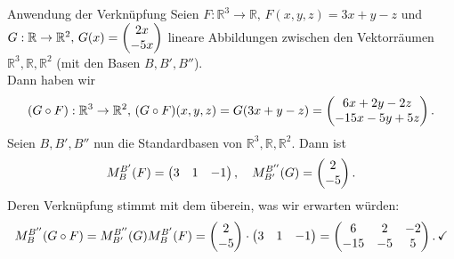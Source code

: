 \begin{Beispiel}{Anwendung der Verknüpfung}\label{beisp:12VerknupfungLinAbb}
Seien $F:\mathbb{R}^3\to\mathbb{R},\,F(x,y,z)=3x+y-z$ und $G:\mathbb{R}\to \mathbb{R}^2,\,G(x)=\begin{pmatrix}2x\\-5x\end{pmatrix}$ lineare Abbildungen zwischen den Vektorräumen $\mathbb{R}^3,\mathbb{R},\mathbb{R}^2$ (mit den Basen $B,B',B''$).\\
Dann haben wir
\begin{equation*}
    (G\circ F):\mathbb{R}^3\to\mathbb{R}^2,\, (G\circ F)(x,y,z)=G(3x+y-z)=\begin{pmatrix}6x+2y-2z\\-15x-5y+5z\end{pmatrix}.
\end{equation*}
Seien $B,B',B''$ nun die Standardbasen von $\mathbb{R}^3,\mathbb{R},\mathbb{R}^2$. Dann ist
\begin{equation*}
    M_B^{B'}(F)=\begin{pmatrix}3 & 1 &-1\end{pmatrix},\quad M_{B'}^{B''}(G)=\begin{pmatrix}2\\-5\end{pmatrix}.
\end{equation*}
Deren Verknüpfung stimmt mit dem überein, was wir erwarten würden:
\begin{equation*}
    M_B^{B''}(G\circ F)=M_{B'}^{B''}(G)M_{B}^{B'}(F)=\begin{pmatrix}2\\-5\end{pmatrix}\cdot \begin{pmatrix}3&1&-1\end{pmatrix}=\begin{pmatrix}6&2&-2\\-15&-5&5\end{pmatrix}.\,\checkmark
\end{equation*}
\end{Beispiel}
